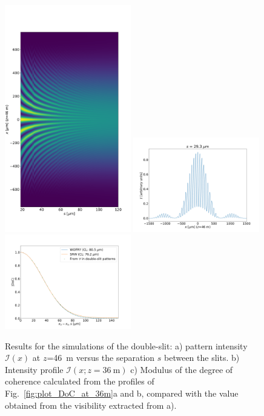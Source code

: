 \documentclass{iucr}              %
\begin{document}
\begin{figure}
    \label{fig:doubleslit}
    \begin{multicols}{2}
    \includegraphics[width=0.49\textwidth]{figures/doubleslit_scan.pdf}
    \newpage
    \vspace*{1cm}
    \includegraphics[width=0.49\textwidth]{figures/doubleslit_profile.pdf}
    \includegraphics[width=0.49\textwidth]{figures/doubleslit_DoC.pdf}
    \end{multicols}
    \caption{Results for the simulations of the double-slit:  a) pattern intensity $\mathcal{I}(x)$ at $z$=46~m versus the separation $s$ between the slits. b) Intensity profile $\mathcal{I}(x;z=36~\text{m})$ c) Modulus of the degree of coherence calculated from the profiles of Fig.~\ref{fig:plot_DoC_at_36m}a and b, compared with the value obtained from the visibility extracted from a). 
    }
\end{figure}
\end{document}
